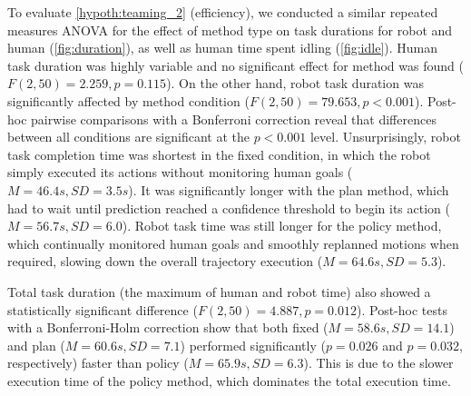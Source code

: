 To evaluate \cref{hypoth:teaming_2} (efficiency), we conducted a similar repeated measures ANOVA for the effect of method type on task durations for robot and human (\cref{fig:duration}), as well as human time spent idling (\cref{fig:idle}).
Human task duration was highly variable and no significant effect for method was found ($F(2,50)=2.259, p = 0.115$). On the other hand, robot task duration was significantly affected by method condition ($F(2,50)=79.653, p<0.001$). Post-hoc pairwise comparisons with a Bonferroni correction reveal that differences between all conditions are significant at the $p < 0.001$ level. Unsurprisingly, robot task completion time was shortest in the fixed condition, in which the robot simply executed its actions without monitoring human goals ($M=46.4s, SD=3.5s$). It was significantly longer with the plan method, which had to wait until prediction reached a confidence threshold to begin its action ($M=56.7s, SD=6.0$). Robot task time was still longer for the policy method, which continually monitored human goals and smoothly replanned motions when required, slowing down the overall trajectory execution ($M=64.6s, SD=5.3$). 

Total task duration (the maximum of human and robot time) also showed a statistically significant difference ($F(2,50)=4.887, p = 0.012$). Post-hoc tests with a Bonferroni-Holm correction show that both fixed ($M=58.6s, SD=14.1$) and plan ($M=60.6s, SD=7.1$) performed significantly ($p = 0.026$ and $p=0.032$, respectively) faster than policy ($M=65.9s, SD=6.3$). This is due to the slower execution time of the policy method, which dominates the total execution time. 

